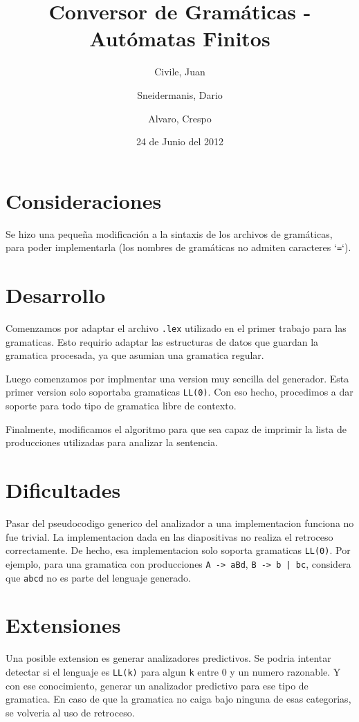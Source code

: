\documentclass[11pt,a4paper,titlepage]{article}
\title{Conversor de Gramáticas - Autómatas Finitos}
\author{Civile, Juan \and Sneidermanis, Dario \and Alvaro, Crespo}
\date{24 de Junio del 2012}
\begin{document}
\newcommand{\awesome}[1]{\texttt{\large #1}}

\maketitle
\tableofcontents
\clearpage

\section{Consideraciones}
Se hizo una pequeña modificación a la sintaxis de los archivos de gramáticas, para poder implementarla (los nombres de gramáticas no admiten caracteres `\texttt{=}`).

\section{Desarrollo}
Comenzamos por adaptar el archivo \texttt{.lex} utilizado en el primer trabajo para las gramaticas.
Esto requirio adaptar las estructuras de datos que guardan la gramatica procesada, ya que asumian una gramatica regular.

Luego comenzamos por implmentar una version muy sencilla del generador.
Esta primer version solo soportaba gramaticas \texttt{LL(0)}.
Con eso hecho, procedimos a dar soporte para todo tipo de gramatica libre de contexto.

Finalmente, modificamos el algoritmo para que sea capaz de imprimir la lista de producciones utilizadas para analizar la sentencia.

\section{Dificultades}
Pasar del pseudocodigo generico del analizador a una implementacion funciona no fue trivial.
La implementacion dada en las diapositivas no realiza el retroceso correctamente.
De hecho, esa implementacion solo soporta gramaticas \texttt{LL(0)}.
Por ejemplo, para una gramatica con producciones \texttt{A -> aBd}, \texttt{B -> b | bc}, considera que \texttt{abcd} no es parte del lenguaje generado.


\section{Extensiones}
Una posible extension es generar analizadores predictivos.
Se podria intentar detectar si el lenguaje es \texttt{LL(k)} para algun \texttt{k} entre 0 y un numero razonable.
Y con ese conocimiento, generar un analizador predictivo para ese tipo de gramatica.
En caso de que la gramatica no caiga bajo ninguna de esas categorias, se volveria al uso de retroceso.
\end{document}
